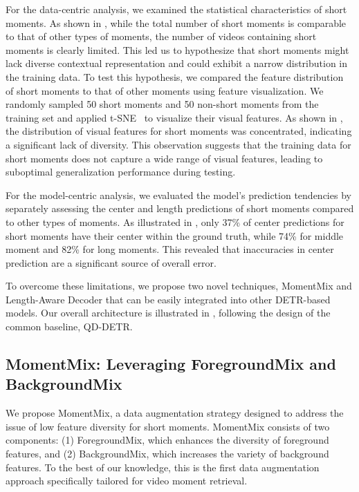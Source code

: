 For the data-centric analysis, we examined the statistical characteristics of short moments. As shown in , while the total number of short moments is comparable to that of other types of moments, the number of videos containing short moments is clearly limited. This led us to hypothesize that short moments might lack diverse contextual representation and could exhibit a narrow distribution in the training data. To test this hypothesis, we compared the feature distribution of short moments to that of other moments using feature visualization. We randomly sampled 50 short moments and 50 non-short moments from the training set and applied t-SNE~\cite{van2008tsne} to visualize their visual features. As shown in , the distribution of visual features for short moments was concentrated, indicating a significant lack of diversity. This observation suggests that the training data for short moments does not capture a wide range of visual features, leading to suboptimal generalization performance during testing.
 

For the model-centric analysis, we evaluated the model's prediction tendencies by separately assessing the center and length predictions of short moments compared to other types of moments. As illustrated in , only 37\% of center predictions for short moments have their center within the ground truth, while 74\% for middle moment and 82\%  for long moments. This revealed that inaccuracies in center prediction are a significant source of overall error.

To overcome these limitations, we propose two novel techniques, MomentMix and Length-Aware Decoder that can be easily integrated into other DETR-based models. Our overall architecture is illustrated in , following the design of the common baseline, QD-DETR.

\subsection{MomentMix: Leveraging ForegroundMix and BackgroundMix}
\label{subsec:MomentMix_Augmentation}

We propose MomentMix, a data augmentation strategy designed to address the issue of low feature diversity for short moments. MomentMix consists of two components: (1) ForegroundMix, which enhances the diversity of foreground features, and (2) BackgroundMix, which increases the variety of background features. To the best of our knowledge, this is the first data augmentation approach specifically tailored for video moment retrieval.

